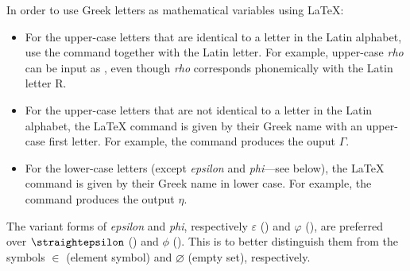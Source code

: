 \begin{latextip}
In order to use Greek letters as mathematical variables using \LaTeX{}:
\begin{itemize}
\item For the upper-case letters that are identical to a letter in the Latin alphabet, use the  command together with the Latin letter. For example, upper-case \textit{rho} can be input as , even though \textit{rho} corresponds phonemically with the Latin letter R.
\item For the upper-case letters that are not identical to a letter in the Latin alphabet, the \LaTeX{} command is given by their Greek name with an upper-case first letter. For example, the command  produces the ouput $\Gamma$.
\item For the lower-case letters (except \textit{epsilon} and \textit{phi}---see below), the \LaTeX{} command is given by their Greek name in lower case. For example, the command  produces the output $\eta$.
\end{itemize}
The variant forms of \textit{epsilon} and \textit{phi}, respectively $\varepsilon$ () and $\varphi$ (), are preferred over $\text{\straightepsilon}$ () and $\phi$ (). This is to better distinguish them from the symbols $\in$ (element symbol) and $\varnothing$ (empty set), respectively.
\end{latextip}


